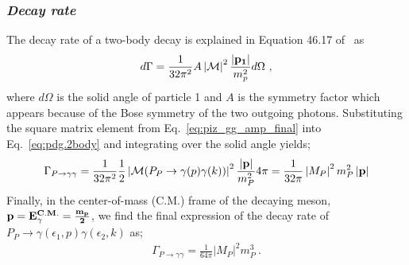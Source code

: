 \subsubsection{\emph{Decay rate}}
The decay rate of a two-body decay is explained in Equation 46.17 of~\cite{pdg2014} as
\begin{align}\label{eq:pdg.2body}
d\Gamma = \frac{1}{32 \pi^2} A \left|{\cal M}\right|^2\frac{\left|\bf{p_1}\right|}{m_p^2}d\Omega \ ,
\end{align}
where $d\Omega$ is the solid angle of particle 1 and $A$ is the symmetry factor which appears because of the Bose symmetry of the two
outgoing photons. Substituting the square matrix element from Eq.~\ref{eq:piz_gg_amp_final} into Eq.~\ref{eq:pdg.2body} and integrating over the solid angle yields;
\begin{align}
\Gamma_{P\rightarrow\gamma\gamma} = \frac{1}{32\pi^{2}} \frac{1}{2} \left|{\cal M}(P_{P}\to\gamma(p)\gamma(k))\right|^{2} \frac{\left|\bf{p}\right|}{m_{P}^2} 4 \pi = \frac{1}{32 \pi}\left|M_{P}\right|^{2}m_{P}^{2}\left|\bf{p}\right|
\end{align} 
Finally, in the center-of-mass (C.M.) frame of the decaying meson, $\bf{p} = E_{\gamma}^{C.M.} = \frac{m_p}{2}$, we find the final expression of the decay rate of $P_P \to \gamma(\epsilon_1,p) \gamma(\epsilon_2,k)$ as;
\begin{align}\label{eq:piz.gg.decay.final}
\Gamma_{P\rightarrow\gamma\gamma} = \frac{1}{64\pi} \left|M_{P}\right|^{2}m_{P}^{3} \ .
\end{align}
%

%

